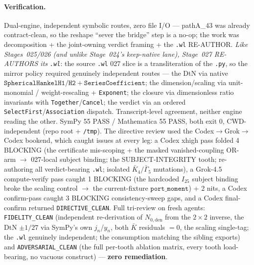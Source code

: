 \paragraph{Verification.}
Dual-engine, independent symbolic routes, zero file I/O --- pathA\_43 was already contract-clean, so the reshape ``sever the
bridge'' step is a no-op; the work was decomposition + the joint-owning verdict framing + the \texttt{.wl} RE-AUTHOR.
\emph{Like Stages~025/026 (and unlike Stage~024's keep-native lane), Stage~027 RE-AUTHORS its \texttt{.wl}}: the source
\texttt{.wl} 027 slice is a transliteration of the \texttt{.py}, so the mirror policy required genuinely independent routes ---
the DtN via native \(\texttt{SphericalHankelH1}/\texttt{H2}+\texttt{SeriesCoefficient}\); the dimension/scaling via
unit-monomial / weight-rescaling + \texttt{Exponent}; the closure via dimensionless ratio invariants with
\texttt{Together}/\texttt{Cancel}; the verdict via an ordered \texttt{SelectFirst}/\texttt{Association} dispatch.
Transcript-level agreement, neither engine reading the other. SymPy 55 PASS / Mathematica 55 PASS, both exit 0,
CWD-independent (repo root + \texttt{/tmp}). The directive review used the Codex\(\to\)Grok\(\to\)Codex bookend, which caught
issues at every leg: a Codex xhigh pass folded 4 BLOCKING (the certificate mis-scoping + the masked vanished-coupling OR-arm
\(\to\) 027-local subject binding; the SUBJECT-INTEGRITY tooth; re-authoring all verdict-bearing \texttt{.wl}; isolated
\(\bar K_4/\bar\Gamma_5\) mutations), a Grok-4.5 compute-verify pass caught 1 BLOCKING (the hardcoded \(I_{25}\) subject
binding broke the scaling control \(\to\) the current-fixture \(\texttt{port\_moment}\)) + 2 nits, a Codex confirm-pass caught
3 BLOCKING consistency-sweep gaps, and a Codex final-confirm returned \texttt{DIRECTIVE\_CLEAN}. Full tri-review on fresh
agents: \texttt{FIDELITY\_CLEAN} (independent re-derivation of \(N_{0,\mathrm{den}}\) from the \(2\times2\) inverse, the DtN
\(\pm1/27\) via SymPy's own \(j_n\)/\(y_n\), both \(\bar K\) residuals \(=0\), the scaling single-tag; the \texttt{.wl}
genuinely independent; the consumption matching the sibling exports) and \texttt{ADVERSARIAL\_CLEAN} (the full per-tooth
ablation matrix, every tooth load-bearing, no vacuous construct) --- \textbf{zero remediation}.

